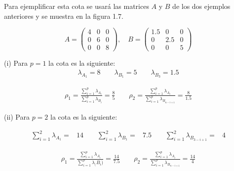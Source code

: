 \begin{example}
Para ejemplificar esta cota se usará las matrices $A$ y $B$ de los dos ejemplos anteriores y se muestra en la figura 1.7.


\begin{equation*}
A = \left(\!
    \begin{array}{ccc}
      4 & 0 & 0 \\
      0 & 6 & 0 \\
      0 & 0 & 8 
    \end{array}
  \!\right), \quad
B = \left(\!
    \begin{array}{ccc}
      1.5 & 0 & 0 \\
      0 & 2.5 & 0 \\
      0 & 0 & 5 
    \end{array}
\!\right) 
\end{equation*}


(i) Para $p = 1$ la cota es la siguiente:
\begin{equation*}
\begin{aligned}
  \lambda_{A_1} = 8 \qquad
  \lambda_{B_1} = 5 \qquad
  \lambda_{B_3} = 1.5
\end{aligned}
\end{equation*}

\begin{equation*}
\begin{aligned}
\rho_1 = \frac{\sum_{i = 1}^{p}\lambda_{A_i}}{\sum_{i = 1}^{p}\lambda_{B_i}}  = \frac{8}{5} \qquad
\rho_2 = \frac{\sum_{i = 1}^{p}\lambda_{A_i}}{\sum_{i = 1}^{p}\lambda_{B_{n-i+1}}}  = \frac{8}{1.5}
\end{aligned}
\end{equation*}

(ii) Para $p = 2$ la cota es la siguiente:

\begin{equation*}
\begin{aligned}
\sum_{i = 1}^{2}\lambda_{A_1}  =& 14 \qquad
\sum_{i = 1}^{2}\lambda_{B_1}  =& 7.5 \qquad
\sum_{i = 1}^{2}\lambda_{B_{3-i+1}} =& 4
\end{aligned}
\end{equation*}

\begin{equation*}
\begin{aligned}
\rho_1 = \frac{\sum_{i = 1}^{p}\lambda_{A_i}}{\sum_{i = 1}^{p}\lambda_({B_i)}}
 = \frac{14}{7.5} \qquad
\rho_2 = \frac{\sum_{i = 1}^{p}\lambda_{A_i}}{\sum_{i = 1}^{p}\lambda_{B_{n-i+1}}}  = \frac{14}{4}
\end{aligned}
\end{equation*}




\end{example}
